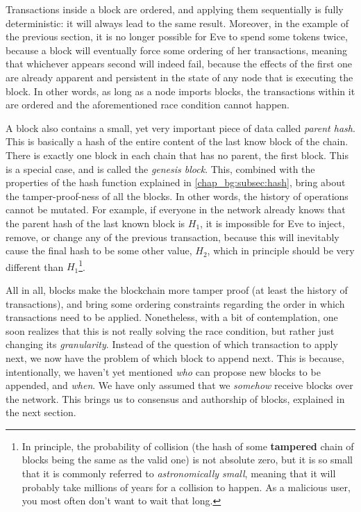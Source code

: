Transactions inside a block are ordered, and applying them sequentially is fully deterministic: it
will always lead to the same result. Moreover, in the example of the previous section, it is no
longer possible for Eve to spend some tokens twice, because a block will eventually force some
ordering of her transactions, meaning that whichever appears second will indeed fail, because the
effects of the first one are already apparent and persistent in the state of any node that is
executing the block. In other words, as long as a node imports blocks, the transactions within it
are ordered and the aforementioned race condition cannot happen.

A block also contains a small, yet very important piece of data called \textit{parent hash}. This is
basically a hash of the entire content of the last know block of the chain. There is exactly one
block in each chain that has no parent, the first block. This is a special case, and is called the
\textit{genesis block}. This, combined with the properties of the hash function explained in
\ref{chap_bg:subsec:hash}, bring about the tamper-proof-ness of all the blocks. In other words, the
history of operations cannot be mutated. For example, if everyone in the network already knows that
the parent hash of the last known block is $H_1$, it is impossible for Eve to inject, remove, or
change any of the previous transaction, because this will inevitably cause the final hash to be some
other value, $H_2$, which in principle should be very different than $H_1$\footnote{In principle,
the probability of collision (the hash of some \textbf{tampered} chain of blocks being the same as
the valid one) is not absolute zero, but it is so small that it is commonly referred to
\textit{astronomically small}, meaning that it will probably take millions of years for a collision
to happen. As a malicious user, you most often don't want to wait that long.}.

All in all, blocks make the blockchain more tamper proof (at least the history of transactions), and
bring some ordering constraints regarding the order in which transactions need to be applied.
Nonetheless, with a bit of contemplation, one soon realizes that this is not really solving the race
condition, but rather just changing its \textit{granularity}. Instead of the question of which
transaction to apply next, we now have the problem of which block to append next. This is because,
intentionally, we haven't yet mentioned \textit{who} can propose new blocks to be appended, and
\textit{when}. We have only assumed that we \textit{somehow} receive blocks over the network. This
brings us to consensus and authorship of blocks, explained in the next section.

